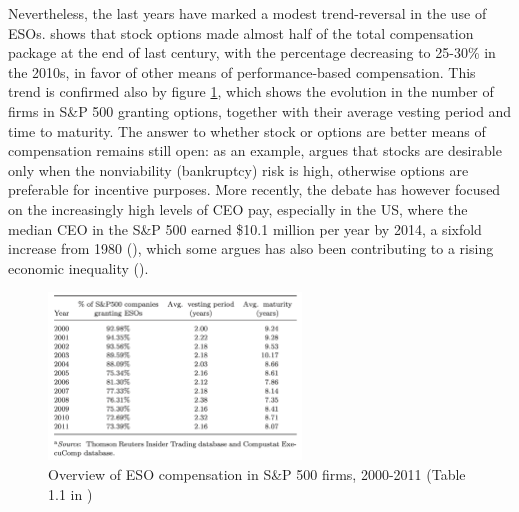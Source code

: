Nevertheless, the last years have marked a modest trend-reversal in the use of ESOs. \cite{frydman2010ceo} shows that stock options made almost half of the total compensation package at the end of last century, with the percentage decreasing to 25-30\% in the 2010s, in favor of other means of performance-based compensation. This trend is confirmed also by figure \ref{fig:leung_tab_1-1}, which shows the evolution in the number of firms in S\&P 500 granting options, together with their average vesting period and time to maturity. The answer to whether stock or options are better means of compensation remains still open: as an example, \cite{kadan2008stocks} argues that stocks are desirable only when the nonviability (bankruptcy) risk is high, otherwise options are preferable for incentive purposes. 
More recently, the debate has however focused on the increasingly high levels of CEO pay, especially in the US, where the median CEO in the S\&P 500 earned \$10.1 million per year by 2014, a sixfold increase from 1980 (\cite{edmans2017executive}), which some argues has also been contributing to a rising economic inequality (\cite{mishel2012ceo}).

\vspace*{15pt}
\begin{figure}[H]
    \centering
    \includegraphics[width=0.6\textwidth]{fig/2/Leung_tab1-1.png}
    \caption{Overview of ESO compensation in S\&P 500 firms, 2000-2011 (Table 1.1 in \cite{leung2021employee})}
    \label{fig:leung_tab_1-1}
\end{figure}
\vspace*{15pt}


